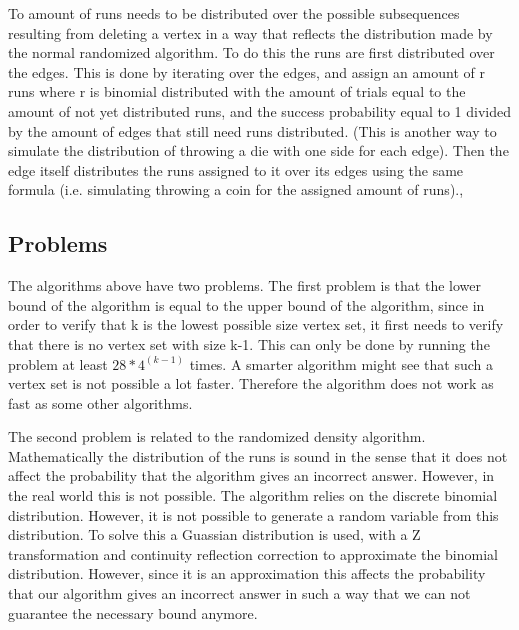 To amount of runs needs to be distributed over the possible subsequences resulting from deleting a vertex in a way that reflects the distribution made by the normal randomized algorithm. To do this the runs are first distributed over the edges. This is done by iterating over the edges, and assign an amount of r runs where r is binomial distributed with the amount of trials equal to the amount of not yet distributed runs, and the success probability equal to 1 divided by the amount of edges that still need runs distributed. (This is another way to simulate the distribution of throwing a die with one side for each edge). Then the edge itself distributes the runs assigned to it over its edges using the same formula (i.e. simulating throwing a coin for the assigned amount of runs).,

\subsection{Problems}
The algorithms above have two problems. The first problem is that the lower bound of the algorithm is equal to the upper bound of the algorithm, since in order to verify that k is the lowest possible size vertex set, it first needs to verify that there is no vertex set with size k-1. This can only be done by running the problem at least $28*4^(k -1)$ times. A smarter algorithm might see that such a vertex set is not possible a lot faster. Therefore the algorithm does not work as fast as some other algorithms.

The second problem is related to the randomized density algorithm. Mathematically the distribution of the runs is sound in the sense that it does not affect the probability that the algorithm gives an incorrect answer. However, in the real world this is not possible. The algorithm relies on the discrete binomial distribution. However, it is not possible to generate a random variable from this distribution. To solve this a Guassian distribution is used, with a Z transformation and continuity reflection correction to approximate the binomial distribution. However, since it is an approximation this affects the probability that our algorithm gives an incorrect answer in such a way that we can not guarantee the necessary bound anymore. 